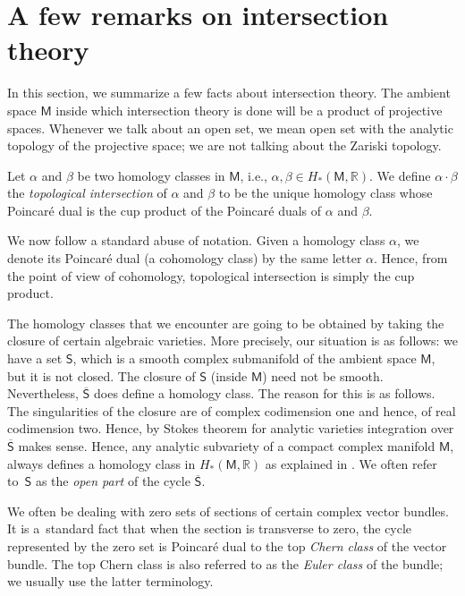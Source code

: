 \documentclass[11pt]{article}
\numberwithin{equation}{section}
\begin{document}
\section{A few remarks on intersection theory}

In this section, we summarize a few facts about intersection theory.
The ambient space $\mathsf{M}$
inside which intersection theory is done will be a product
of projective spaces. Whenever we talk about an open set,
we mean open set with the analytic topology of the projective space;
we are not talking about the Zariski topology.

Let $\alpha$ and $\beta$ be two homology classes
in $\mathsf{M}$, i.e., $\alpha, \beta \in H_*(\mathsf{M}, \mathbb{R})$.
We define $\alpha\cdot \beta$ the \emph{topological intersection} of
$\alpha$ and $\beta$ to be the unique homology class whose Poincar\'{e} dual is the
cup product of the Poincar\'{e} duals of $\alpha$ and $\beta$.

We now follow a standard abuse of notation.
Given a homology class $\alpha$, we denote its Poincar\'{e} dual (a cohomology class)
by the same letter $\alpha$.
Hence, from the point of view of cohomology,
topological intersection is simply the cup product.

The homology classes that we encounter are going to be obtained
by taking the closure of certain algebraic varieties. More precisely,
our situation is as follows: we have a set $\mathsf{S}$, which is
a smooth complex submanifold of the ambient space $\mathsf{M}$, but it is
not closed. The closure of $\mathsf{S}$ (inside $\mathsf{M}$)
need not be smooth. Nevertheless, $\overline{\mathsf{S}}$ does define a homology class.
The reason for this is as follows. The singularities of the closure are of
complex codimension one and hence, of real codimension two. Hence, by Stokes theorem
for analytic varieties
\cite[p.~33]{GH3}
integration over $\overline{\mathsf{S}}$ makes sense.
Hence, any analytic subvariety of a compact complex manifold $\mathsf{M}$, always
defines a homology class in $H_*(\mathsf{M}, \mathbb{R})$ as explained in
\cite[pp.~33 and 61]{GH3}. We often refer to~$\mathsf{S}$ as the
\emph{open part} of the cycle $\overline{\mathsf{S}}$.

We often be dealing with zero sets of sections of certain complex vector bundles.
It is a~standard fact that when the section is transverse to zero, the cycle represented
by the zero set is Poincar\'{e} dual to the top \emph{Chern class} of the vector bundle.
The top Chern class is also referred to as the \emph{Euler class} of the bundle; we
usually use the latter terminology.
\end{document}
